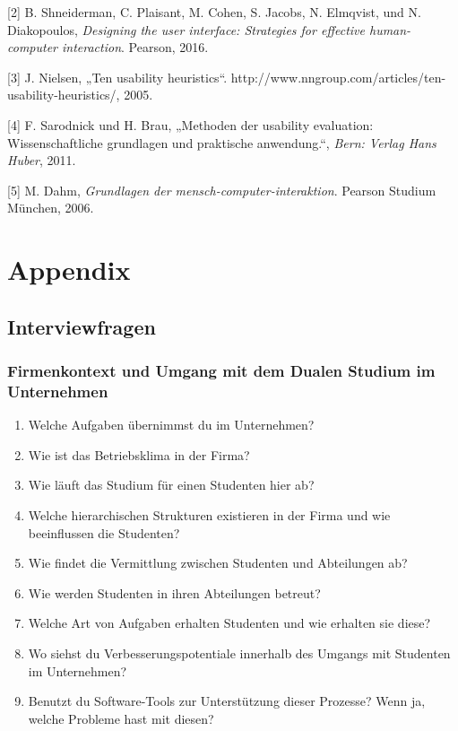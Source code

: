 \documentclass[
  12pt,
  ngerman,
  a4paper,
]{article}
\begin{document}
\leavevmode\hypertarget{ref-heur:shneiderman}{}%
{[}2{]} B. Shneiderman, C. Plaisant, M. Cohen, S. Jacobs, N. Elmqvist,
und N. Diakopoulos, \emph{Designing the user interface: Strategies for
effective human-computer interaction}. Pearson, 2016.

\leavevmode\hypertarget{ref-heur:nielsen}{}%
{[}3{]} J. Nielsen, „Ten usability heuristics``.
http://www.nngroup.com/articles/ten-usability-heuristics/, 2005.

\leavevmode\hypertarget{ref-heur:brauux2fsarodnick}{}%
{[}4{]} F. Sarodnick und H. Brau, „Methoden der usability evaluation:
Wissenschaftliche grundlagen und praktische anwendung.``, \emph{Bern:
Verlag Hans Huber}, 2011.

\leavevmode\hypertarget{ref-heur:dahm}{}%
{[}5{]} M. Dahm, \emph{Grundlagen der mensch-computer-interaktion}.
Pearson Studium München, 2006.

\pagebreak
\appendix
\section*{Appendix}
\renewcommand{\thesubsection}{\Alph{subsection}}

\hypertarget{interviewfragen}{%
\subsection{Interviewfragen}\label{interviewfragen}}

\hypertarget{firmenkontext-und-umgang-mit-dem-dualen-studium-im-unternehmen}{%
\subsubsection{Firmenkontext und Umgang mit dem Dualen Studium im
Unternehmen}\label{firmenkontext-und-umgang-mit-dem-dualen-studium-im-unternehmen}}

\begin{enumerate}
\def\labelenumi{\arabic{enumi}.}
\item
  Welche Aufgaben übernimmst du im Unternehmen?
\item
  Wie ist das Betriebsklima in der Firma?
\item
  Wie läuft das Studium für einen Studenten hier ab?
\item
  Welche hierarchischen Strukturen existieren in der Firma und wie
  beeinflussen die Studenten?
\item
  Wie findet die Vermittlung zwischen Studenten und Abteilungen ab?
\item
  Wie werden Studenten in ihren Abteilungen betreut?
\item
  Welche Art von Aufgaben erhalten Studenten und wie erhalten sie diese?
\item
  Wo siehst du Verbesserungspotentiale innerhalb des Umgangs mit
  Studenten im Unternehmen?
\item
  Benutzt du Software-Tools zur Unterstützung dieser Prozesse? Wenn ja,
  welche Probleme hast mit diesen?
\end{enumerate}
\end{document}
